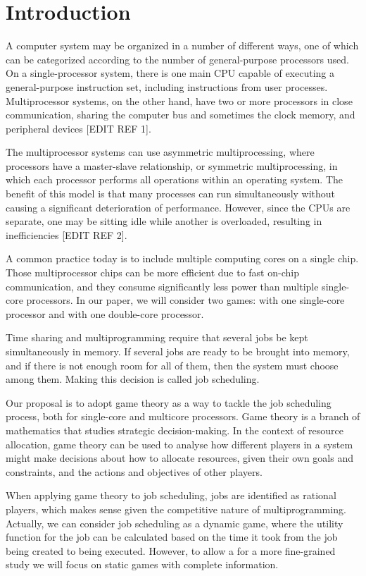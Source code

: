 \section{Introduction}
A computer system may be organized in a number of different ways, one of which can be categorized according to the number of general-purpose processors used. On a single-processor system, there is one main CPU capable of executing a general-purpose instruction set, including instructions from user processes. Multiprocessor systems, on the other hand, have two or more processors in close communication, sharing the computer bus and sometimes the clock memory, and peripheral devices [EDIT REF 1].

The multiprocessor systems can use asymmetric multiprocessing, where processors have a master-slave relationship, or symmetric multiprocessing, in which each processor performs all operations within an operating system. The benefit of this model is that many processes can run simultaneously without causing a significant deterioration of performance. However, since the CPUs are separate, one may be sitting idle while another is overloaded, resulting in inefficiencies [EDIT REF 2]. 

A common practice today is to include multiple computing cores on a single chip. Those multiprocessor chips can be more efficient due to fast on-chip communication, and they consume significantly less power than multiple single-core processors. In our paper, we will consider two games: with one single-core processor and with one double-core processor. 

Time sharing and multiprogramming require that several jobs be kept simultaneously in memory. If several jobs are ready to be brought into memory, and if there is not enough room for all of them, then the system must choose among them. Making this decision is called job scheduling. 

Our proposal is to adopt game theory as a way to tackle the job scheduling process, both for single-core and multicore processors. Game theory is a branch of mathematics that studies strategic decision-making. In the context of resource allocation, game theory can be used to analyse how different players in a system might make decisions about how to allocate resources, given their own goals and constraints, and the actions and objectives of other players. 

When applying game theory to job scheduling, jobs are identified as rational players, which makes sense given the competitive nature of multiprogramming. Actually, we can consider job scheduling as a dynamic game, where the utility function for the job can be calculated based on the time it took from the job being created to being executed. However, to allow a for a more fine-grained study we will focus on static games with complete information.


